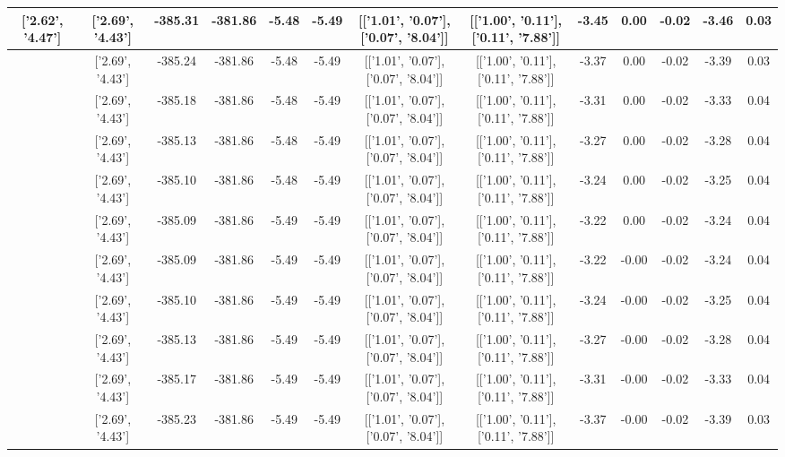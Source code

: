 \begin{table}[htbp]
\begin{adjustbox}{angle=90}
\begin{tabular}{|c|c|c|c|c|c|c|c|c|c|c|c|c|}
 ['2.62', '4.47'] & ['2.69', '4.43'] & -385.31 & -381.86 & -5.48 & -5.49 & [['1.01', '0.07'], ['0.07', '8.04']] & [['1.00', '0.11'], ['0.11', '7.88']] & -3.45 & 0.00 & -0.02 & -3.46 & 0.03\\ \hline
 ['2.63', '4.46'] & ['2.69', '4.43'] & -385.24 & -381.86 & -5.48 & -5.49 & [['1.01', '0.07'], ['0.07', '8.04']] & [['1.00', '0.11'], ['0.11', '7.88']] & -3.37 & 0.00 & -0.02 & -3.39 & 0.03\\ \hline
 ['2.64', '4.46'] & ['2.69', '4.43'] & -385.18 & -381.86 & -5.48 & -5.49 & [['1.01', '0.07'], ['0.07', '8.04']] & [['1.00', '0.11'], ['0.11', '7.88']] & -3.31 & 0.00 & -0.02 & -3.33 & 0.04\\ \hline
 ['2.66', '4.45'] & ['2.69', '4.43'] & -385.13 & -381.86 & -5.48 & -5.49 & [['1.01', '0.07'], ['0.07', '8.04']] & [['1.00', '0.11'], ['0.11', '7.88']] & -3.27 & 0.00 & -0.02 & -3.28 & 0.04\\ \hline
 ['2.67', '4.44'] & ['2.69', '4.43'] & -385.10 & -381.86 & -5.48 & -5.49 & [['1.01', '0.07'], ['0.07', '8.04']] & [['1.00', '0.11'], ['0.11', '7.88']] & -3.24 & 0.00 & -0.02 & -3.25 & 0.04\\ \hline
 ['2.68', '4.44'] & ['2.69', '4.43'] & -385.09 & -381.86 & -5.49 & -5.49 & [['1.01', '0.07'], ['0.07', '8.04']] & [['1.00', '0.11'], ['0.11', '7.88']] & -3.22 & 0.00 & -0.02 & -3.24 & 0.04\\ \hline
 ['2.70', '4.43'] & ['2.69', '4.43'] & -385.09 & -381.86 & -5.49 & -5.49 & [['1.01', '0.07'], ['0.07', '8.04']] & [['1.00', '0.11'], ['0.11', '7.88']] & -3.22 & -0.00 & -0.02 & -3.24 & 0.04\\ \hline
 ['2.71', '4.43'] & ['2.69', '4.43'] & -385.10 & -381.86 & -5.49 & -5.49 & [['1.01', '0.07'], ['0.07', '8.04']] & [['1.00', '0.11'], ['0.11', '7.88']] & -3.24 & -0.00 & -0.02 & -3.25 & 0.04\\ \hline
 ['2.72', '4.42'] & ['2.69', '4.43'] & -385.13 & -381.86 & -5.49 & -5.49 & [['1.01', '0.07'], ['0.07', '8.04']] & [['1.00', '0.11'], ['0.11', '7.88']] & -3.27 & -0.00 & -0.02 & -3.28 & 0.04\\ \hline
 ['2.73', '4.41'] & ['2.69', '4.43'] & -385.17 & -381.86 & -5.49 & -5.49 & [['1.01', '0.07'], ['0.07', '8.04']] & [['1.00', '0.11'], ['0.11', '7.88']] & -3.31 & -0.00 & -0.02 & -3.33 & 0.04\\ \hline
 ['2.75', '4.41'] & ['2.69', '4.43'] & -385.23 & -381.86 & -5.49 & -5.49 & [['1.01', '0.07'], ['0.07', '8.04']] & [['1.00', '0.11'], ['0.11', '7.88']] & -3.37 & -0.00 & -0.02 & -3.39 & 0.03\\ \hline

\end{tabular}
\end{adjustbox}
\end{table}
